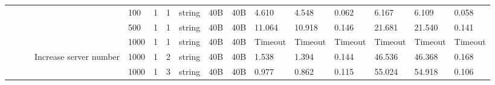 \begin{landscape}
\begin{table}[]
{\begin{tabular}{@{}ccccllllllllllll@{}}
                                                &                              &                               &                                                 & 100                                      & 1                                          & 1                                 & string                           & 40B                                           & 40B                                             & 4.610                   & 4.548    & 0.062                        & 6.167                   & 6.109    & 0.058                        \\
                                                &                              &                               &                                                 & 500                                      & 1                                          & 1                                 & string                           & 40B                                           & 40B                                             & 11.064                  & 10.918   & 0.146                        & 21.681                  & 21.540   & 0.141                        \\
                                                &                              &                               &                                                 & 1000                                     & 1                                          & 1                                 & string                           & 40B                                           & 40B                                             & Timeout                 & Timeout  & Timeout                      & Timeout                 & Timeout  & Timeout                      \\
                                                &                              &                               & \multirow{2}{*}{Increase server number}         & 1000                                     & 1                                          & 2                                 & string                           & 40B                                           & 40B                                             & 1.538                   & 1.394    & 0.144                        & 46.536                  & 46.368   & 0.168                        \\
                                                &                              &                               &                                                 & 1000                                     & 1                                          & 3                                 & string                           & 40B                                           & 40B                                             & 0.977                   & 0.862    & 0.115                        & 55.024                  & 54.918   & 0.106                        \\

\end{tabular}}
\end{table}
\end{landscape}
